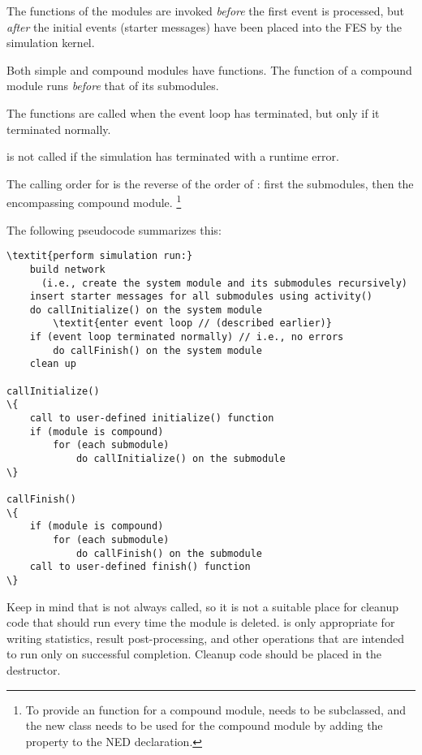 The  functions of the modules are invoked \textit{before}
the first event is processed, but \textit{after} the initial events (starter
messages) have been placed into the FES by
the simulation kernel.

Both simple and compound modules have  functions. The
 function of a compound module runs \textit{before} that of
its submodules.

The  functions are called when the event loop
has terminated, but only if it terminated normally.

\begin{note}
 is not called if the simulation has terminated
with a runtime error.
\end{note}

The calling order for  is the reverse of the order of
: first the submodules, then the encompassing compound module.
  \footnote{To provide an  function for a compound module,
   needs to be subclassed, and the new class needs to be used
  for the compound module by adding the  property to the NED declaration.}

The following pseudocode summarizes this:

\begin{Verbatim}[commandchars=\\\{\}]
\textit{perform simulation run:}
    build network
      (i.e., create the system module and its submodules recursively)
    insert starter messages for all submodules using activity()
    do callInitialize() on the system module
        \textit{enter event loop // (described earlier)}
    if (event loop terminated normally) // i.e., no errors
        do callFinish() on the system module
    clean up

callInitialize()
\{
    call to user-defined initialize() function
    if (module is compound)
        for (each submodule)
            do callInitialize() on the submodule
\}

callFinish()
\{
    if (module is compound)
        for (each submodule)
            do callFinish() on the submodule
    call to user-defined finish() function
\}
\end{Verbatim}

Keep in mind that  is not always called, so it is not
a suitable place for cleanup code that should run every time the module is
deleted.  is only appropriate for writing statistics,
result post-processing, and other operations that are intended to run only on
successful completion. Cleanup code should be placed in the
destructor.


